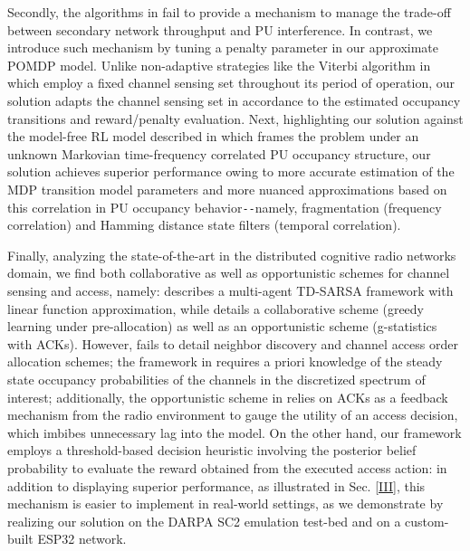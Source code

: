 \documentclass[12pt, draftcls, onecolumn]{IEEEtran}
\begin{document}
Secondly, the algorithms in \cite{WCL:4, WCL:5, WCL:6, WCL:7, WCL:9, WCL:10, WCL:8, WCL:3, WCL:11, WCL:MIT, WCL:DQN} fail to provide a mechanism to manage the trade-off between secondary network throughput and PU interference.
In contrast, we introduce such mechanism by tuning a penalty parameter in our approximate POMDP model. 
 Unlike non-adaptive strategies like the Viterbi algorithm in \cite{WCL:6} which employ a fixed channel sensing set throughout its period of operation, our solution adapts the channel sensing set in accordance to the estimated occupancy transitions and reward/penalty evaluation. Next, highlighting our solution against the model-free RL model described in \cite{WCL:DQN} which frames the problem under an unknown Markovian time-frequency correlated PU occupancy structure, our solution achieves superior performance owing to more accurate estimation of the MDP transition model parameters and more nuanced approximations based on this correlation in PU occupancy behavior\texttt{-{}-}namely, fragmentation (frequency correlation) and Hamming distance state filters (temporal correlation).

Finally, analyzing the state-of-the-art in the distributed cognitive radio networks domain, we find both collaborative as well as opportunistic schemes for channel sensing and access, namely: \cite{WCL:5} describes a multi-agent TD-SARSA framework with linear function approximation, while \cite{WCL:MIT} details a collaborative scheme (greedy learning under pre-allocation) as well as an opportunistic scheme (g-statistics with ACKs). However, \cite{WCL:5} fails to detail neighbor discovery and channel access order allocation schemes;  the framework in \cite{WCL:MIT} requires a priori knowledge of the steady state occupancy probabilities of the channels in the discretized spectrum of interest; additionally, the opportunistic scheme in \cite{WCL:MIT} relies on ACKs as a feedback mechanism from the radio environment to gauge the utility of an access decision, which imbibes unnecessary lag into the model. On the other hand, our framework employs a threshold-based decision heuristic involving the posterior belief probability to evaluate the reward obtained from the executed access action: in addition to displaying superior performance, as illustrated in Sec. \ref{III}, this mechanism is easier to implement in real-world settings, as we demonstrate by realizing our solution on the DARPA SC2 emulation test-bed and on a custom-built ESP32 network.
\end{document}
